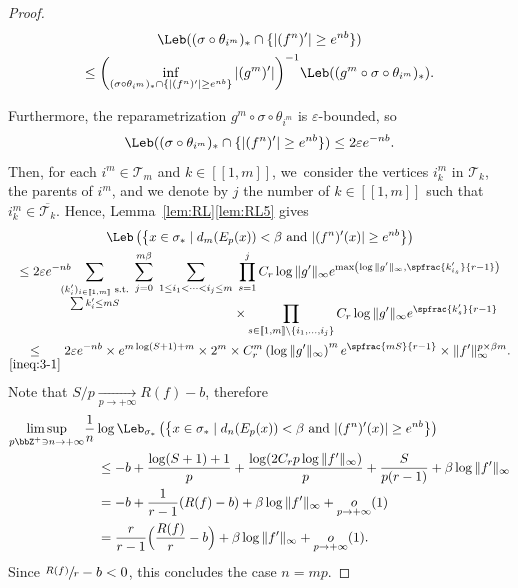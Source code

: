 \begin{proof}
\begin{minipage}{\textwidth}
\begin{multline*}
\Leb ((\sigma \circ \theta_{i^m})_* \cap \{ |(f^n)'| \geq e^{nb} \})\\
\leq \biggl (\inf_{(\sigma \circ \theta_{i^m})_* \cap \{ |(f^n)'| \geq e^{nb} \}} |(g^m)'|\biggr)^{-1} \Leb ((g^m \circ \sigma \circ \theta_{i^m})_*).
\end{multline*}
\end{minipage}
\par\smallskip\noindent
Furthermore, the reparametrization $g^m \circ \sigma \circ \theta_{i^m}$ is $\varepsilon$-bounded, so
\[
\Leb ((\sigma \circ \theta_{i^m})_* \cap \{ |(f^n)'| \geq e^{nb} \}) \leq 2 \varepsilon e^{-nb}.
\]
Then, for each $i^m \in \mathcal{T}_m$ and $k \in [\![ 1, m ]\!]$, we~consider the vertices $i^m_k$ in $\mathcal{T}_k$, \ie the parents of $i^m$, and we denote by $j$ the number of $k \in [\![ 1, m ]\!]$ such that $i_k^m \in \overline{\mathcal{T}_k}$. Hence,  Lemma~\ref{lem:RL}\eqref{lem:RL5} gives
\begin{multline*}
\Leb\left (\left \{ x \in \sigma_* \mid d_m(E_p(x)) < \beta \text{ and } | (f^n)'(x) | \geq e^{nb}\right \} \right)\\
\leq 2 \varepsilon e^{- nb} \hspace{-1em}\sum_{\substack{(k_i')_{i \in [\![ 1, m ]\!]} \text{ s.t.}\\
\sum k_i' \leq m S}} \; \sum_{j = 0}^{m \beta} \; \sum_{1 \leq i_1 < \cdots < i_j \leq m}\; \prod_{s=1}^j C_r \log \| g' \|_{\infty} e^{\max \left (\log \| g' \|_{\infty}, \spfrac{k_{i_s}'}{r-1} \right)}\\[-1em]
\shoveright{\times \prod_{s \in [\![ 1, m ]\!] \setminus \{ i_1,\dots, i_j \}} C_r \log \| g' \|_{\infty} e^{\spfrac{k_s'}{r-1}}}\\
\underset{\eqref{ineq:3-1}}{\leq} 2 \varepsilon e^{-nb} \times e^{m \log (S + 1) + m} \times 2^m \times C_r^m \left (\log \| g' \|_{\infty} \right)^m e^{\spfrac{m S}{r-1}} \times \| f' \|_{\infty}^{p \times \beta m}.
\end{multline*}
Note that $S/p \underset{p \to +\infty}{\longrightarrow} R(f) - b$, therefore
\begin{align*}
\limsup_{p \bbZ^+ \ni n \to +\infty} &\frac{1}{n} \log \Leb_{\sigma_*} \left (\left \{ x \in \sigma_* \mid d_n(E_p(x)) < \beta \text{ and } | (f^n)'(x) | \geq e^{nb} \right \} \right)\\
&\hspace{1em}\leq -b + \frac{\log(S+1) + 1}{p} + \frac{\log (2 C_r p \log \| f ' \|_{\infty})}{p}
+ \frac{S}{p(r-1)} + \beta \log \| f' \|_{\infty}\\
&\hspace{1em}= -b + \frac{1}{r-1}(R(f) - b) + \beta \log \| f' \|_{\infty} + \underset{p \to +\infty}{o}(1)\\
&\hspace{1em}=\frac{r}{r-1}\Bigl (\frac{R(f)}{r} - b \Bigr) + \beta \log \| f' \|_{\infty} + \underset{p \to +\infty}{o}(1).
\end{align*}
Since $\sfrac{R(f)}{r} - b < 0$, this concludes the case $n=mp$.


\end{proof}

